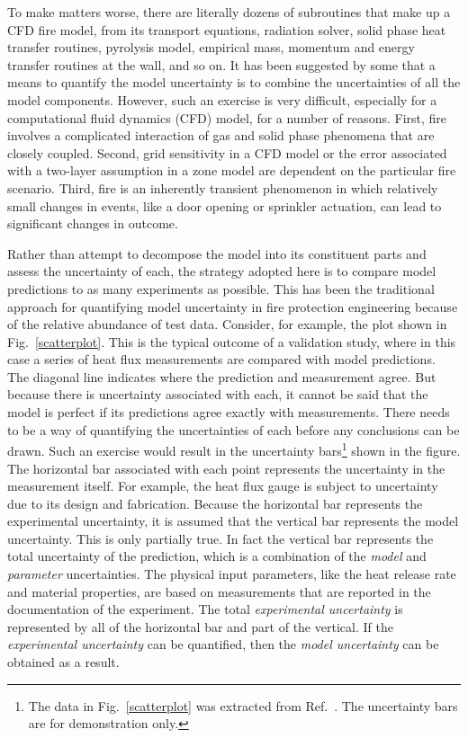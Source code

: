 To make matters worse, there are literally dozens of subroutines that make up a CFD fire model,
from its transport equations, radiation solver, solid phase heat transfer routines, pyrolysis model,
empirical mass, momentum and energy transfer routines at the wall, and so on.
It has been suggested by some that
a means to quantify the model uncertainty is to combine the uncertainties of all the model
components.
However, such an exercise is very difficult, especially for a computational fluid dynamics (CFD) model,
for a number of reasons. First, fire involves
a complicated interaction of gas and solid phase phenomena that are closely coupled.
Second, grid sensitivity in a CFD model or the error associated with
a two-layer assumption in a zone model are dependent on the particular fire scenario.
Third, fire is an inherently transient phenomenon in which relatively small
changes in events, like a door opening or sprinkler actuation, can lead to significant changes in outcome.

Rather than attempt to decompose the model into its constituent parts and assess the uncertainty of
each, the strategy adopted here is to compare model predictions to as many
experiments as possible. This has been the traditional approach for quantifying model uncertainty in fire
protection engineering because of the relative abundance of test data. Consider, for example, the
plot shown in Fig.~\ref{scatterplot}. This is the typical outcome of a validation study, where in this case a series of
heat flux measurements are compared with model predictions.
The diagonal line indicates where the prediction and measurement agree.
But because there is uncertainty associated with each, it cannot be said that the model is perfect if its predictions
agree exactly with measurements.
There needs to be a way of quantifying the uncertainties of each before any conclusions can be drawn.
Such an exercise would result in the uncertainty
bars\footnote{The data in Fig.~\ref{scatterplot} was extracted from Ref.~\cite{NUREG_1824}.
The uncertainty bars are for demonstration only.}
shown in the figure. The
horizontal bar associated with each point represents the uncertainty in the measurement itself.
For example, the heat flux gauge is subject to uncertainty due to its design and fabrication.
Because the horizontal bar represents the experimental uncertainty, it is assumed that the vertical
bar represents the model uncertainty. This is only partially true. In fact the vertical bar represents the total
uncertainty of the prediction, which is a combination of the {\em model} and {\em parameter} uncertainties. The physical
input parameters, like the heat release rate and material properties, are based on measurements that are reported
in the documentation of the experiment.
The total {\em experimental uncertainty} is represented by all of the horizontal bar and part of the vertical.
If the {\em experimental uncertainty} can be quantified, then the {\em model uncertainty} can be obtained as a result.


